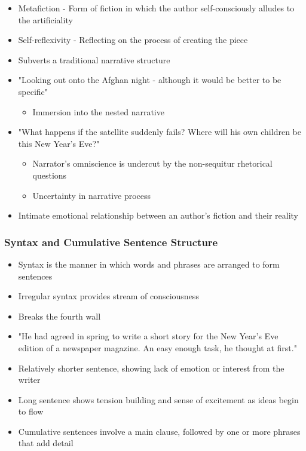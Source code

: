 		\begin{itemize}
			\item Metafiction - Form of fiction in which the author self-consciously alludes to the artificiality
			\item Self-reflexivity - Reflecting on the process of creating the piece
			\item Subverts a traditional narrative structure
			\item "Looking out onto the Afghan night - although it would be better to be specific"
				\begin{itemize}
					\item Immersion into the nested narrative
				\end{itemize}
			\item "What happens if the satellite suddenly fails? Where will his own children be this New Year's Eve?"
				\begin{itemize}
					\item Narrator's omniscience is undercut by the non-sequitur rhetorical questions
					\item Uncertainty in narrative process
				\end{itemize}
			\item Intimate emotional relationship between an author's fiction and their reality
		\end{itemize}

	\subsubsection{Syntax and Cumulative Sentence Structure}
	
		\begin{itemize}
			\item Syntax is the manner in which words and phrases are arranged to form sentences
			\item Irregular syntax provides stream of consciousness
			\item Breaks the fourth wall
			\item "He had agreed in spring to write a short story for the New Year's Eve edition of a newspaper magazine. An easy enough task, he thought at first."
			\item Relatively shorter sentence, showing lack of emotion or interest from the writer
			\item Long sentence shows tension building and sense of excitement as ideas begin to flow
			\item Cumulative sentences involve a main clause, followed by one or more phrases that add detail
		\end{itemize}

